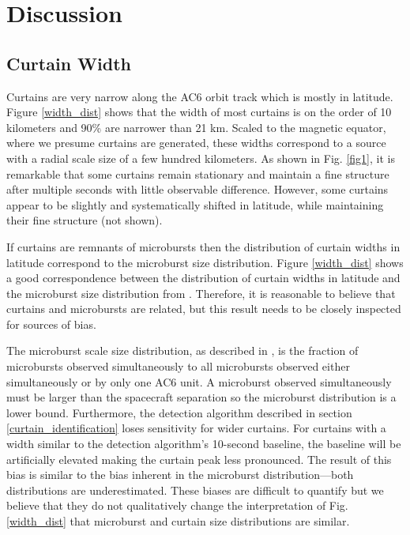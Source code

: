 \documentclass[draft]{agujournal2019}
\begin{document}
\section{Discussion} \label{discussion}
\subsection{Curtain Width}
Curtains are very narrow along the AC6 orbit track which is mostly in latitude. Figure \ref{width_dist} shows that the width of most curtains is on the order of 10 kilometers and 90\% are narrower than 21 km. Scaled to the magnetic equator, where we presume curtains are generated, these widths correspond to a source with a radial scale size of a few hundred kilometers. As shown in Fig. \ref{fig1}, it is remarkable that some curtains remain stationary and maintain a fine structure after multiple seconds with little observable difference. However, some curtains appear to be slightly and systematically shifted in latitude, while maintaining their fine structure (not shown).

If curtains are remnants of microbursts then the distribution of curtain widths in latitude correspond to the microburst size distribution. Figure \ref{width_dist} shows a good correspondence between the distribution of curtain widths in latitude and the microburst size distribution from . Therefore, it is reasonable to believe that curtains and microbursts are related, but this result needs to be closely inspected for sources of bias. 

The microburst scale size distribution, as described in , is the fraction of microbursts observed simultaneously to all microbursts observed either simultaneously or by only one AC6 unit. A microburst observed simultaneously must be larger than the spacecraft separation so the microburst distribution is a lower bound. Furthermore, the detection algorithm described in section \ref{curtain_identification} loses sensitivity for wider curtains. For curtains with a width similar to the detection algorithm’s 10-second baseline, the baseline will be artificially elevated making the curtain peak less pronounced.
The result of this bias is similar to the bias inherent in the microburst distribution---both distributions are underestimated. These biases are difficult to quantify but we believe that they do not qualitatively change the interpretation of Fig. \ref{width_dist} that microburst and curtain size distributions are similar.
\end{document}
